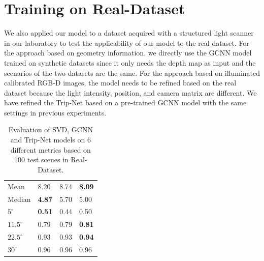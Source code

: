 \section{Training on Real-Dataset}
We also applied our model to a dataset acquired with a structured light scanner in our laboratory to test the applicability of our model to the real dataset. For the approach based on geometry information, we directly use the GCNN model trained on synthetic datasets since it only needs the depth map as input and the scenarios of the two datasets are the same. For the approach based on illuminated calibrated RGB-D images, the model needs to be refined based on the real dataset because the light intensity, position, and camera matrix are different. We have refined the Trip-Net based on a pre-trained GCNN model with the same settings in previous experiments.


\begin{table}[H]
	\centering
	\captionsetup{width=\linewidth}
	\begin{tabular}{l | l l l }
		\toprule
		\tabhead{Metrics} & \tabhead{SVD} & \tabhead{GCNN} & \tabhead{Trip-Net} \\
		\midrule
		Mean  					& 8.20 & 8.74 & \textbf{8.09}\\ 
		\hline
		Median					& \textbf{4.87} & 5.70 & 5.00 \\ 
		\hline
		$ 5^\circ $ 			& \textbf{0.51} & 0.44 & 0.50 \\
		\hline
		$ 11.5^\circ $ 			& 0.79 & 0.79 & \textbf{0.81} \\
		\hline
		$ 22.5^\circ $ 			& 0.93 & 0.93 & \textbf{0.94} \\
		\hline
		$ 30^\circ $ 			& 0.96 & 0.96 & 0.96 \\
		\bottomrule
	\end{tabular}
	\caption{Evaluation of SVD, GCNN and Trip-Net models on 6 different metrics based on 100 test scenes in Real-Dataset.}	
	\label{tab:real_eval}
\end{table}




